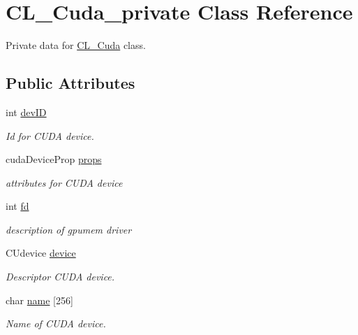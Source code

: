 \hypertarget{classCL__Cuda__private}{
\section{CL\_\-Cuda\_\-private Class Reference}
\label{classCL__Cuda__private}
}


Private data for \hyperlink{classCL__Cuda}{CL\_\-Cuda} class.  
\subsection*{Public Attributes}
\begin{DoxyCompactItemize}
\item 
int \hyperlink{classCL__Cuda__private_ac48da65acdaf7d7400a98a6d2f893f1e}{devID}
\begin{DoxyCompactList}\small\item\em Id for CUDA device. \item\end{DoxyCompactList}\item 
cudaDeviceProp \hyperlink{classCL__Cuda__private_ad7b57a953847c106179d0b0504111fb3}{props}
\begin{DoxyCompactList}\small\item\em attributes for CUDA device \item\end{DoxyCompactList}\item 
int \hyperlink{classCL__Cuda__private_a35f342c3bcf3de609aa03c2d1c8665a4}{fd}
\begin{DoxyCompactList}\small\item\em description of gpumem driver \item\end{DoxyCompactList}\item 
CUdevice \hyperlink{classCL__Cuda__private_a8743e6aaa2155f6695cd8165f07f8225}{device}
\begin{DoxyCompactList}\small\item\em Descriptor CUDA device. \item\end{DoxyCompactList}\item 
char \hyperlink{classCL__Cuda__private_a3f0394a7cd0f0e7542e9f33252eca8b6}{name} \mbox{[}256\mbox{]}
\begin{DoxyCompactList}\small\item\em Name of CUDA device. \item\end{DoxyCompactList}\item 

\end{DoxyCompactItemize}

